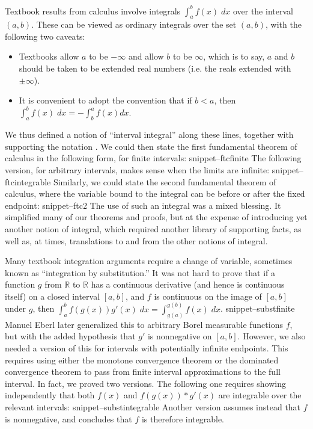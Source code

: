 \documentclass{svjour3}
\newcommand{\RR}{\mathbb{R}}
\newcommand{\Snippet}[1]{\csname snippet--#1\endcsname}
\begin{document}
Textbook results from calculus involve integrals $\int_a^b f(x) \; dx$ over the interval $(a,b)$. These can be viewed as ordinary integrals over the set $(a,b)$, with the following two caveats:
\begin{itemize}
 \item Textbooks allow $a$ to be $-\infty$ and allow $b$ to be $\infty$, which is to say, $a$ and $b$ should be taken to be extended real numbers (i.e. the reals extended with $\pm\infty$).
 \item It is convenient to adopt the convention that if $b < a$, then \\ $\int_a^b f(x) \; dx = -\int_b^a f(x) dx$.
\end{itemize}
We thus defined a notion of ``interval integral'' along these lines, together with supporting the notation . We could then state the first fundamental theorem of calculus in the following form, for finite intervals:
\Snippet{ftcfinite}
The following version, for arbitrary intervals, makes sense when the limits are infinite:
\Snippet{ftcintegrable}
Similarly, we could state the second fundamental theorem of calculus, where the variable bound to the integral can be before or after the fixed endpoint:
\Snippet{ftc2}
The use of such an integral was a mixed blessing. It simplified many of our theorems and proofs, but at the expense of introducing yet another notion of integral, which required another library of supporting facts, as well as, at times, translations to and from the other notions of integral.

Many textbook integration arguments require a change of variable, sometimes known as ``integration by substitution.'' It was not hard to prove that if a function $g$ from $\RR$ to $\RR$ has a continuous derivative (and hence is continuous itself) on a closed interval $[a,b]$, and $f$ is continuous on the image of $[a, b]$ under $g$, then $\int_a^b f(g(x)) g'(x) \; dx = \int_{g(a)}^{g(b)} f(x) \; dx$.
\Snippet{substfinite}
Manuel Eberl later generalized this to arbitrary Borel measurable functions $f$, but with the added hypothesis that $g'$ is nonnegative on $[a, b]$. However, we also needed a version of this for intervals with potentially infinite endpoints. This requires using either the monotone convergence theorem or the dominated convergence theorem to pass from finite interval approximations to the full interval. In fact, we proved two versions. The following one requires showing independently that both $f(x)$ and $f(g(x)) * g'(x)$ are integrable over the relevant intervals:
\Snippet{substintegrable}
Another version assumes instead that $f$ is nonnegative, and concludes that $f$ is therefore integrable.
\end{document}
